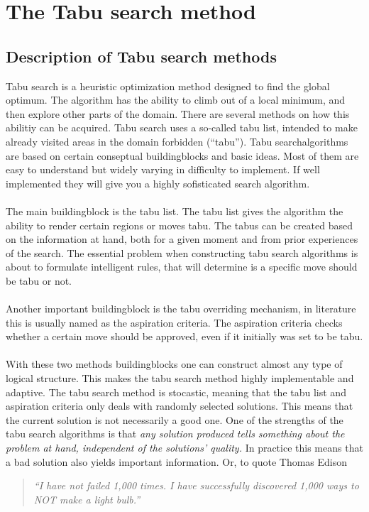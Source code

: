 \pagebreak
\section{The Tabu search method}
\subsection{Description of Tabu search methods}
Tabu search is a heuristic optimization method designed to find the global optimum. The algorithm has the ability to climb out of a local minimum, and then explore other parts of the domain. There are several methods on how this abilitiy can be acquired. Tabu search uses a so-called tabu list, intended to make already visited areas in the domain forbidden (``tabu''). Tabu searchalgorithms are based on certain conseptual buildingblocks and basic ideas. Most of them are easy to understand but widely varying in difficulty to implement. If well implemented they will give you a highly sofisticated search algorithm. \\
\\The main buildingblock is the tabu list. The tabu list gives the algorithm the ability to render certain regions or moves tabu. The tabus can be created based on the information at hand, both for a given moment and from prior experiences of the search. The essential problem when constructing tabu search algorithms is about to formulate intelligent rules, that will determine is a specific move should be tabu or not.\\
\\Another important buildingblock is the tabu overriding mechanism, in literature this is usually named as the aspiration criteria. The aspiration criteria checks whether a certain move should be approved, even if it initially was set to be tabu. \\
\\With these two methods buildingblocks one can construct almost any type of logical structure. This makes the tabu search method highly implementable and adaptive. The tabu search method is stocastic, meaning that the tabu list and aspiration criteria only deals with randomly selected solutions. This means that the current solution is not necessarily a good one. One of the strengths of the tabu search algorithms is that \emph{any solution produced tells something about the problem at hand, independent of the solutions' quality.} In practice this means that a bad solution also yields important information.  Or, to quote Thomas Edison 
\begin{quotation}
\emph{``I have not failed 1,000 times.  I have
successfully discovered 1,000 ways to NOT make a light bulb.''}
\end{quotation}
